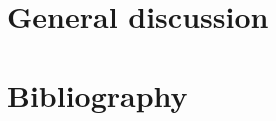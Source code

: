 \documentclass[11pt]{report}
\renewcommand{\baselinestretch}{1.5}
\begin{document}
\begin{refsection}
\chapter{General discussion}





\clearpage
{}
\chapter*{Bibliography}
\renewcommand{\baselinestretch}{1}
\printbibliography[heading=none]

\end{refsection}
\end{document}
